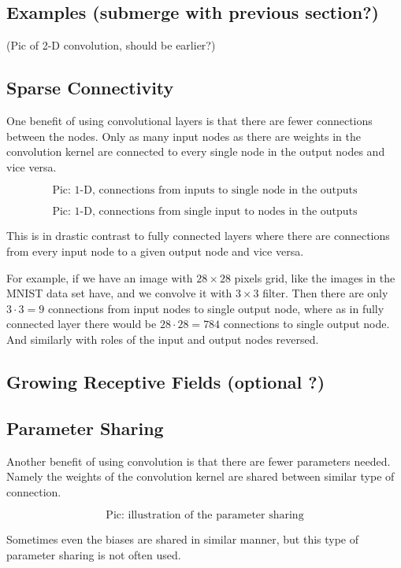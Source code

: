\documentclass[]{article}
\begin{document}
\subsection{Examples (submerge with previous section?)}
(Pic of 2-D convolution, should be earlier?)

\subsection{Sparse Connectivity}
One benefit of using convolutional layers is that there are fewer connections
between the nodes. Only as many input nodes as there are weights in the
convolution kernel are connected to every single node in the output nodes and
vice versa.

\[
\text{Pic: 1-D, connections from inputs to single node in the outputs}
\]

\[
\text{Pic: 1-D, connections from single input to nodes in the outputs}
\]

This is in drastic contrast to fully connected layers where there are connections
from every input node to a given output node and vice versa.

For example, if we have an image with $28 \times 28$ pixels grid, like the images
in the MNIST data set have, and we convolve it with $3 \times 3$ filter. Then
there are only $3 \cdot 3 = 9$ connections from input nodes to single output node,
where as in fully connected layer there would be $28 \cdot 28 = 784$ connections
to single output node. And similarly with roles of the input and output nodes reversed.

\subsection{Growing Receptive Fields (optional ?)}

\subsection{Parameter Sharing}
Another benefit of using convolution is that there are fewer parameters needed.
Namely the weights of the convolution kernel are shared between similar type of
connection.

\[
\text{Pic: illustration of the parameter sharing}
\]

Sometimes even the biases are shared in similar manner, but this type of
parameter sharing is not often used.
\end{document}
